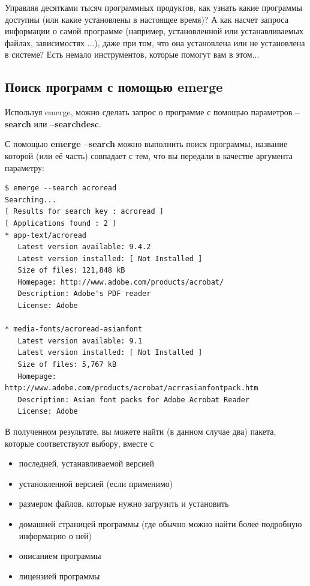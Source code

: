 \documentclass[10pt]{book}
\begin{document}
Управляя десятками тысяч программных продуктов, как узнать какие программы доступны (или какие установлены в настоящее время)? А как насчет запроса информации о самой программе (например, установленной или устанавливаемых файлах, зависимостях ...), даже при том, что она установлена или не установлена в системе? Есть немало инструментов, которые помогут вам в этом...

\subsection{Поиск программ с помощью emerge}

Используя emerge, можно сделать запрос о программе с помощью параметров  \textbf{--search} или \textbf{--searchdesc}.

С помощью \textbf{emerge --search} можно выполнить поиск программы, название которой (или её часть) совпадает с тем, что вы передали в качестве аргумента параметру:
\begin{tcolorbox}
\begin{lstlisting}
$ emerge --search acroread
Searching...
[ Results for search key : acroread ]
[ Applications found : 2 ]
* app-text/acroread
   Latest version available: 9.4.2
   Latest version installed: [ Not Installed ]
   Size of files: 121,848 kB
   Homepage: http://www.adobe.com/products/acrobat/
   Description: Adobe's PDF reader
   License: Adobe

* media-fonts/acroread-asianfont
   Latest version available: 9.1
   Latest version installed: [ Not Installed ]
   Size of files: 5,767 kB
   Homepage: http://www.adobe.com/products/acrobat/acrrasianfontpack.htm
   Description: Asian font packs for Adobe Acrobat Reader
   License: Adobe
\end{lstlisting}
\end{tcolorbox}

В полученном результате, вы можете найти (в данном случае два) пакета, которые соответствуют выбору, вместе с
\begin{itemize} 
\item последней, устанавливаемой версией
\item установленной версией (если применимо)
\item размером файлов, которые нужно загрузить и установить
\item домашней страницей программы (где обычно можно найти более подробную информацию о ней)
\item описанием программы
\item лицензией программы
\end{itemize}
\end{document}
